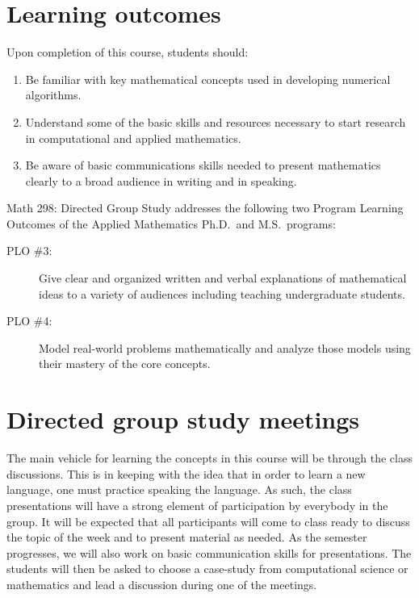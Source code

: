 \documentclass[11pt]{article}
\newcommand{\secskip}{\vspace{6pt}}
\begin{document}
\secskip

\noindent
\section*{Learning outcomes} Upon completion of this course, students should:
\begin{enumerate}

\item Be familiar with key mathematical concepts used in developing numerical algorithms.
 
\item Understand some of the basic skills and resources necessary to start research in computational and applied mathematics.

\item Be aware of basic communications skills needed to present mathematics clearly to a
  broad audience in writing and in speaking.
  
\end{enumerate}

\secskip

\noindent
Math 298: Directed Group Study addresses the following two Program Learning Outcomes of the Applied Mathematics
Ph.D.~and M.S.~programs:

\begin{description}
\item[\quad PLO \#3:] Give clear and organized written and verbal explanations
  of mathematical ideas to a variety of audiences including teaching
  undergraduate students.
\item[\quad PLO \#4:] Model real-world problems mathematically and analyze those models using their mastery of the core concepts. 
\end{description}

\section*{Directed group study meetings}

The main vehicle for learning the concepts in this course will be through the class discussions.  This is in keeping with the idea that in order to learn a new language, one must practice speaking the language.   As such, the class presentations will have a strong element of participation by everybody in the group.  It will be expected that all participants will come to class ready to discuss the topic of the week and to present material as needed.  As the semester progresses, we will also work on basic communication skills for presentations.  The students will then be asked to choose a case-study from computational science or mathematics and lead a discussion during one of the meetings. 
\end{document}

